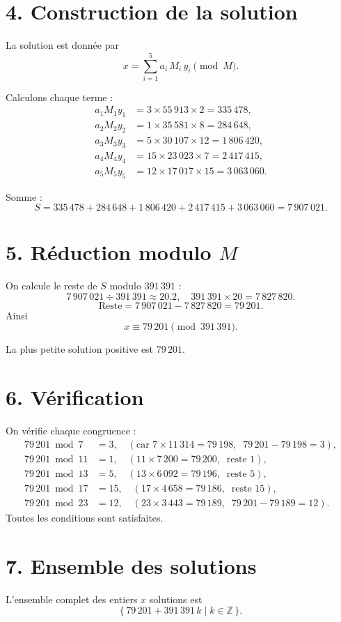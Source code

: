 \documentclass[12pt,a4paper]{article}
\begin{document}
\section*{4. Construction de la solution}
La solution est donnée par
\[
x = \sum_{i=1}^{5} a_i \, M_i \, y_i \pmod{M}.
\]

Calculons chaque terme :
\begin{align*}
a_1 M_1 y_1 &= 3 \times 55\,913 \times 2 = 335\,478, \\
a_2 M_2 y_2 &= 1 \times 35\,581 \times 8 = 284\,648, \\
a_3 M_3 y_3 &= 5 \times 30\,107 \times 12 = 1\,806\,420, \\
a_4 M_4 y_4 &= 15 \times 23\,023 \times 7 = 2\,417\,415, \\
a_5 M_5 y_5 &= 12 \times 17\,017 \times 15 = 3\,063\,060.
\end{align*}

Somme :
\[
S = 335\,478 + 284\,648 + 1\,806\,420 + 2\,417\,415 + 3\,063\,060 = 7\,907\,021.
\]

\section*{5. Réduction modulo $M$}
On calcule le reste de $S$ modulo $391\,391$ :
\[
7\,907\,021 \div 391\,391 \approx 20.2,\quad
391\,391 \times 20 = 7\,827\,820.
\]
\[
\text{Reste} = 7\,907\,021 - 7\,827\,820 = 79\,201.
\]
Ainsi
\[
\boxed{x \equiv 79\,201 \pmod{391\,391}}.
\]

La plus petite solution positive est $79\,201$.

\section*{6. Vérification}
On vérifie chaque congruence :
\begin{align*}
79\,201 \bmod 7   &= 3, \quad (\text{car } 7 \times 11\,314 = 79\,198,\;\; 79\,201-79\,198 = 3),\\
79\,201 \bmod 11  &= 1, \quad (11 \times 7\,200 = 79\,200,\;\; \text{reste }1),\\
79\,201 \bmod 13  &= 5, \quad (13 \times 6\,092 = 79\,196,\;\; \text{reste }5),\\
79\,201 \bmod 17  &= 15, \quad (17 \times 4\,658 = 79\,186,\;\; \text{reste }15),\\
79\,201 \bmod 23  &= 12, \quad (23 \times 3\,443 = 79\,189,\;\; 79\,201-79\,189 = 12).
\end{align*}
Toutes les conditions sont satisfaites.

\section*{7. Ensemble des solutions}
L’ensemble complet des entiers $x$ solutions est
\[
\{ \, 79\,201 + 391\,391\,k \mid k \in \mathbb{Z} \, \}.
\]
\end{document}

